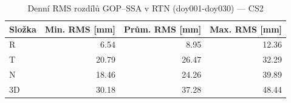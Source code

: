 \begin{table}[H]
\centering
\caption{Denní RMS rozdílů GOP–SSA v RTN (doy001-doy030) — CS2}
\label{tab:cr_ZAZG_doy001-doy030_rms}
\begin{tabular}{lrrr}
\toprule
Složka & Min. RMS [mm] & Prům. RMS [mm] & Max. RMS [mm] \\
\midrule
R & 6.54 & 8.95 & 12.36 \\
T & 20.79 & 26.47 & 32.29 \\
N & 18.46 & 24.26 & 39.89 \\
3D & 30.18 & 37.28 & 48.44 \\
\bottomrule
\end{tabular}
\end{table}
